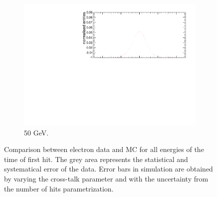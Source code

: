\begin{figure}[htbp!]
\begin{subfigure}[t]{0.49\textwidth}
    \centering
    \includegraphics[width=1\textwidth]{../Thesis_Plots/Timing/Electrons/Plots/Comparison_SimData_Electrons50GeV.pdf}
    \caption{50 GeV.}\label{fig:elec_sim_data_50GeV}
  \end{subfigure}
  \caption{Comparison between electron data and MC for all energies of the time of first hit. The grey area represents the statistical and systematical error of the data. Error bars in simulation are obtained by varying the cross-talk parameter and with the uncertainty from the number of hits parametrization.} \label{fig:sim_data_elec_add}
\end{figure}


